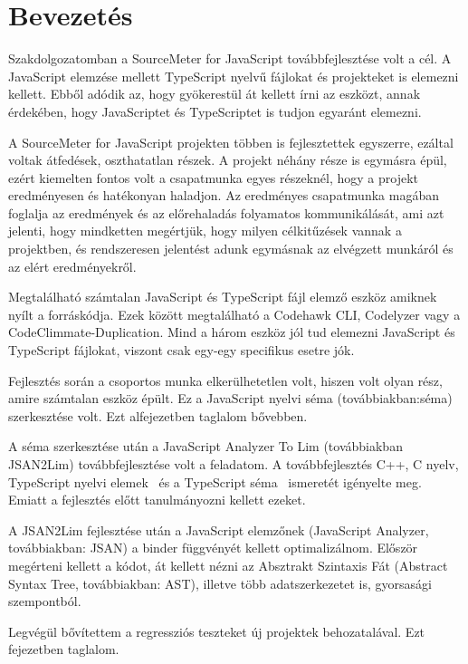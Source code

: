 \chapter{Bevezetés}

\noindent

Szakdolgozatomban a SourceMeter for JavaScript továbbfejlesztése volt a cél.
A JavaScript elemzése mellett TypeScript nyelvű fájlokat és projekteket is elemezni kellett.
Ebből adódik az, hogy gyökerestül át kellett írni az eszközt, annak érdekében,
hogy JavaScriptet és TypeScriptet is tudjon egyaránt elemezni.

\noindent

A SourceMeter for JavaScript projekten többen is fejlesztettek egyszerre, ezáltal voltak átfedések, oszthatatlan részek.
A projekt néhány része is egymásra épül, ezért kiemelten fontos volt a csapatmunka egyes részeknél, hogy a projekt eredményesen és hatékonyan haladjon.
Az eredményes csapatmunka magában foglalja az eredmények és az előrehaladás folyamatos kommunikálását,
ami azt jelenti, hogy mindketten megértjük, hogy milyen célkitűzések vannak a projektben,
és rendszeresen jelentést adunk egymásnak az elvégzett munkáról és az elért eredményekről.

\noindent

Megtalálható számtalan JavaScript és TypeScript fájl elemző eszköz amiknek nyílt a forráskódja.
Ezek között megtalálható a Codehawk CLI, Codelyzer vagy a CodeClimmate-Duplication.
Mind a három eszköz jól tud elemezni JavaScript és TypeScript fájlokat, viszont csak egy-egy specifikus esetre jók.

\noindent

Fejlesztés során a csoportos munka elkerülhetetlen volt, hiszen volt olyan rész, amire számtalan eszköz épült.
Ez a JavaScript nyelvi séma (továbbiakban:séma) szerkesztése volt. Ezt  alfejezetben taglalom bővebben.

\noindent

A séma szerkesztése után a JavaScript Analyzer To Lim (továbbiakban JSAN2Lim) továbbfejlesztése volt a feladatom.
A továbbfejlesztés C++, C nyelv, TypeScript nyelvi elemek~\cite{fenton2014pro, cherny2019programming, nance2014typescript, 10.1007/978-3-662-44202-9_11} és a TypeScript séma~\cite{typescript-eslint} ismeretét igényelte meg.
Emiatt a fejlesztés előtt tanulmányozni kellett ezeket.

\noindent

A JSAN2Lim fejlesztése után a JavaScript elemzőnek (JavaScript Analyzer, továbbiakban: JSAN) a binder függvényét kellett optimalizálnom.
Először megérteni kellett a kódot, át kellett nézni az Absztrakt Szintaxis Fát (Abstract Syntax Tree, továbbiakban: AST), illetve több adatszerkezetet is, gyorsasági szempontból.

\noindent

Legvégül bővítettem a regressziós teszteket új projektek behozatalával. Ezt  fejezetben taglalom.
